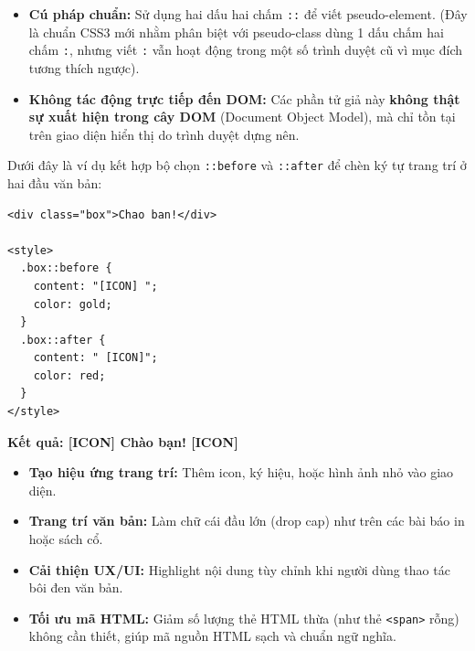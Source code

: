 \documentclass[11pt,oneside]{book}
\newcommand{\codeinline}[1]{\textcolor{accentOrange}{\texttt{#1}}}
\begin{document}
\begin{warnBox}
\begin{itemize}[leftmargin=1.5em, itemsep=4pt, parsep=0pt]
    \item \textbf{Cú pháp chuẩn:} Sử dụng hai dấu hai chấm \codeinline{::} để viết pseudo-element. (Đây là chuẩn CSS3 mới nhằm phân biệt với pseudo-class dùng 1 dấu chấm hai chấm \codeinline{:}, nhưng viết \codeinline{:} vẫn hoạt động trong một số trình duyệt cũ vì mục đích tương thích ngược).
    \item \textbf{Không tác động trực tiếp đến DOM:} Các phần tử giả này \textbf{không thật sự xuất hiện trong cây DOM} (Document Object Model), mà chỉ tồn tại trên giao diện hiển thị do trình duyệt dựng nên.
\end{itemize}
\end{warnBox}

\begin{conceptBox}
Dưới đây là ví dụ kết hợp bộ chọn \codeinline{::before} và \codeinline{::after} để chèn ký tự trang trí ở hai đầu văn bản:
\end{conceptBox}

\begin{codeWindow}
\begin{lstlisting}[language=HTML5]
<div class="box">Chao ban!</div>

<style>
  .box::before {
    content: "[ICON] ";
    color: gold;
  }
  .box::after {
    content: " [ICON]";
    color: red;
  }
</style>
\end{lstlisting}
\end{codeWindow}

\begin{browserWindow}
\sffamily\large\bfseries
\textbf{Kết quả:} [ICON] Chào bạn! [ICON]
\end{browserWindow}

\begin{conceptBox}
\begin{itemize}[leftmargin=1.5em, itemsep=3pt, parsep=0pt]
    \item \textbf{Tạo hiệu ứng trang trí:} Thêm icon, ký hiệu, hoặc hình ảnh nhỏ vào giao diện.
    \item \textbf{Trang trí văn bản:} Làm chữ cái đầu lớn (drop cap) như trên các bài báo in hoặc sách cổ.
    \item \textbf{Cải thiện UX/UI:} Highlight nội dung tùy chỉnh khi người dùng thao tác bôi đen văn bản.
    \item \textbf{Tối ưu mã HTML:} Giảm số lượng thẻ HTML thừa (như thẻ \codeinline{<span>} rỗng) không cần thiết, giúp mã nguồn HTML sạch và chuẩn ngữ nghĩa.
\end{itemize}
\end{conceptBox}
\end{document}
